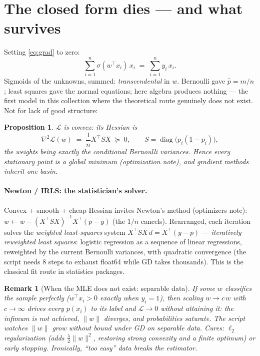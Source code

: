 \documentclass[11pt]{article}
\newtheorem{proposition}{Proposition}
\newtheorem{remark}{Remark}
\newcommand{\sig}{\sigma}
\begin{document}
\section{The closed form dies --- and what survives}

Setting \eqref{eq:grad} to zero:
\begin{equation}
  \sum_{i=1}^n \sig(w^\top x_i)\, x_i \;=\; \sum_{i=1}^n y_i\, x_i .
  \label{eq:stationarity}
\end{equation}
Sigmoids of the unknowns, summed: \emph{transcendental} in $w$. Bernoulli
gave $\hat p = m/n$; least squares gave the normal equations; here
algebra produces nothing --- the first model in this collection where the
theoretical route genuinely does not exist. Not for lack of good
structure:

\begin{proposition}
$\mathcal{L}$ is convex: its Hessian is
\begin{equation}
  \nabla^2 \mathcal{L}(w)
  \;=\; \frac1n X^\top S X \;\succeq\; 0,
  \qquad
  S = \operatorname{diag}\bigl(p_i(1-p_i)\bigr),
  \label{eq:hessian}
\end{equation}
the weights being exactly the conditional Bernoulli variances. Hence
every stationary point is a global minimum (optimization note), and
gradient methods inherit one basin.
\end{proposition}

\paragraph{Newton / IRLS: the statistician's solver.}
Convex + smooth + cheap Hessian invites Newton's method
(optimizers note): $w \leftarrow w - (X^\top S X)^{-1} X^\top(p - y)$
(the $1/n$ cancels). Rearranged, each iteration solves the
\emph{weighted least-squares} system $X^\top S X\, d = X^\top (y - p)$
--- \emph{iteratively reweighted least squares}: logistic regression as a
sequence of linear regressions, reweighted by the current Bernoulli
variances, with quadratic convergence (the script needs 8 steps to
exhaust float64 while GD takes thousands). This is the classical fit
route in statistics packages.

\begin{remark}[When the MLE does not exist: separable data]
If some $w$ classifies the sample perfectly ($w^\top x_i > 0$ exactly
when $y_i = 1$), then scaling $w \to c\,w$ with $c\to\infty$ drives every
$p(x_i)$ to its label and $\mathcal{L} \to 0$ without attaining it: the
infimum is not achieved, $\lVert w\rVert$ diverges, and probabilities
saturate. The script watches $\lVert w\rVert$ grow without bound under GD
on separable data. Cures: $\ell_2$ regularization (adds
$\tfrac{\lambda}{2}\lVert w\rVert^2$, restoring strong convexity and a
finite optimum) or early stopping. Ironically, ``too easy'' data breaks
the estimator.
\end{remark}
\end{document}
